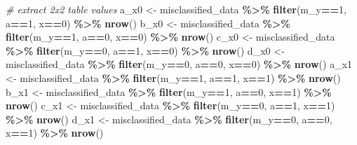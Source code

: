 \documentclass[
]{book}
\newenvironment{Shaded}{\begin{snugshade}}{\end{snugshade}}
\newcommand{\CommentTok}[1]{\textcolor[rgb]{0.56,0.35,0.01}{\textit{#1}}}
\newcommand{\DecValTok}[1]{\textcolor[rgb]{0.00,0.00,0.81}{#1}}
\newcommand{\FunctionTok}[1]{\textcolor[rgb]{0.13,0.29,0.53}{\textbf{#1}}}
\newcommand{\NormalTok}[1]{#1}
\newcommand{\OtherTok}[1]{\textcolor[rgb]{0.56,0.35,0.01}{#1}}
\newcommand{\SpecialCharTok}[1]{\textcolor[rgb]{0.81,0.36,0.00}{\textbf{#1}}}
\begin{document}
\begin{Shaded}
\begin{Highlighting}[]
\CommentTok{\# extract 2x2 table values}
\NormalTok{a\_x0 }\OtherTok{\textless{}{-}}\NormalTok{ misclassified\_data }\SpecialCharTok{\%\textgreater{}\%} \FunctionTok{filter}\NormalTok{(m\_y}\SpecialCharTok{==}\DecValTok{1}\NormalTok{, a}\SpecialCharTok{==}\DecValTok{1}\NormalTok{, x}\SpecialCharTok{==}\DecValTok{0}\NormalTok{) }\SpecialCharTok{\%\textgreater{}\%} \FunctionTok{nrow}\NormalTok{()}
\NormalTok{b\_x0 }\OtherTok{\textless{}{-}}\NormalTok{ misclassified\_data }\SpecialCharTok{\%\textgreater{}\%} \FunctionTok{filter}\NormalTok{(m\_y}\SpecialCharTok{==}\DecValTok{1}\NormalTok{, a}\SpecialCharTok{==}\DecValTok{0}\NormalTok{, x}\SpecialCharTok{==}\DecValTok{0}\NormalTok{) }\SpecialCharTok{\%\textgreater{}\%} \FunctionTok{nrow}\NormalTok{()}
\NormalTok{c\_x0 }\OtherTok{\textless{}{-}}\NormalTok{ misclassified\_data }\SpecialCharTok{\%\textgreater{}\%} \FunctionTok{filter}\NormalTok{(m\_y}\SpecialCharTok{==}\DecValTok{0}\NormalTok{, a}\SpecialCharTok{==}\DecValTok{1}\NormalTok{, x}\SpecialCharTok{==}\DecValTok{0}\NormalTok{) }\SpecialCharTok{\%\textgreater{}\%} \FunctionTok{nrow}\NormalTok{()}
\NormalTok{d\_x0 }\OtherTok{\textless{}{-}}\NormalTok{ misclassified\_data }\SpecialCharTok{\%\textgreater{}\%} \FunctionTok{filter}\NormalTok{(m\_y}\SpecialCharTok{==}\DecValTok{0}\NormalTok{, a}\SpecialCharTok{==}\DecValTok{0}\NormalTok{, x}\SpecialCharTok{==}\DecValTok{0}\NormalTok{) }\SpecialCharTok{\%\textgreater{}\%} \FunctionTok{nrow}\NormalTok{()}
\NormalTok{a\_x1 }\OtherTok{\textless{}{-}}\NormalTok{ misclassified\_data }\SpecialCharTok{\%\textgreater{}\%} \FunctionTok{filter}\NormalTok{(m\_y}\SpecialCharTok{==}\DecValTok{1}\NormalTok{, a}\SpecialCharTok{==}\DecValTok{1}\NormalTok{, x}\SpecialCharTok{==}\DecValTok{1}\NormalTok{) }\SpecialCharTok{\%\textgreater{}\%} \FunctionTok{nrow}\NormalTok{()}
\NormalTok{b\_x1 }\OtherTok{\textless{}{-}}\NormalTok{ misclassified\_data }\SpecialCharTok{\%\textgreater{}\%} \FunctionTok{filter}\NormalTok{(m\_y}\SpecialCharTok{==}\DecValTok{1}\NormalTok{, a}\SpecialCharTok{==}\DecValTok{0}\NormalTok{, x}\SpecialCharTok{==}\DecValTok{1}\NormalTok{) }\SpecialCharTok{\%\textgreater{}\%} \FunctionTok{nrow}\NormalTok{()}
\NormalTok{c\_x1 }\OtherTok{\textless{}{-}}\NormalTok{ misclassified\_data }\SpecialCharTok{\%\textgreater{}\%} \FunctionTok{filter}\NormalTok{(m\_y}\SpecialCharTok{==}\DecValTok{0}\NormalTok{, a}\SpecialCharTok{==}\DecValTok{1}\NormalTok{, x}\SpecialCharTok{==}\DecValTok{1}\NormalTok{) }\SpecialCharTok{\%\textgreater{}\%} \FunctionTok{nrow}\NormalTok{()}
\NormalTok{d\_x1 }\OtherTok{\textless{}{-}}\NormalTok{ misclassified\_data }\SpecialCharTok{\%\textgreater{}\%} \FunctionTok{filter}\NormalTok{(m\_y}\SpecialCharTok{==}\DecValTok{0}\NormalTok{, a}\SpecialCharTok{==}\DecValTok{0}\NormalTok{, x}\SpecialCharTok{==}\DecValTok{1}\NormalTok{) }\SpecialCharTok{\%\textgreater{}\%} \FunctionTok{nrow}\NormalTok{()}


\end{Highlighting}
\end{Shaded}
\end{document}
